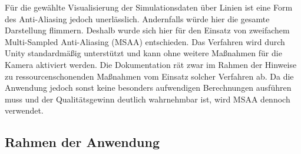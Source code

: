 Für die gewählte Visualisierung der Simulationsdaten über Linien ist eine Form des Anti-Aliasing jedoch unerlässlich. Andernfalls würde hier die gesamte Darstellung flimmern. Deshalb wurde sich hier für den Einsatz von zweifachem Multi-Sampled Anti-Aliasing (MSAA) entschieden. Das Verfahren wird durch Unity standardmäßig unterstützt und kann ohne weitere Maßnahmen für die Kamera aktiviert werden. Die Dokumentation rät zwar im Rahmen der Hinweise zu ressourcenschonenden Maßnahmen vom Einsatz solcher Verfahren ab. Da die Anwendung jedoch sonst keine besonders aufwendigen Berechnungen ausführen muss und der Qualitätsgewinn deutlich wahrnehmbar ist, wird MSAA dennoch verwendet.

\subsection{Rahmen der Anwendung}
\vspace{8px}
\begin{center}
	\\
\end{center}
\vspace{6px}



